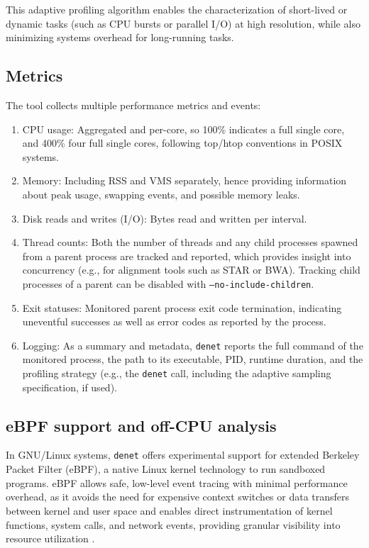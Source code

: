 \documentclass[10pt]{article}
\begin{document}
This adaptive profiling algorithm enables the characterization of short-lived or dynamic tasks (such as CPU bursts or parallel I/O) at high resolution, while also minimizing systems overhead for long-running tasks.

\subsection*{Metrics}

The tool collects multiple performance metrics and events:

\begin{enumerate}[itemsep=0.5pt, topsep=1pt]
    \item CPU usage: Aggregated and per-core, so 100\% indicates a full single core, and 400\% four full single cores, following top/htop conventions in POSIX systems.
    \item Memory: Including RSS and VMS separately, hence providing information about peak usage, swapping events, and possible memory leaks.
    \item Disk reads and writes (I/O): Bytes read and written per interval.
    \item Thread counts: Both the number of threads and any child processes spawned from a parent process are tracked and reported, which provides insight into concurrency (e.g., for alignment tools such as STAR or BWA). Tracking child processes of a parent can be disabled with \texttt{--no-include-children}.
    \item Exit statuses: Monitored parent process exit code termination, indicating uneventful successes as well as error codes as reported by the process.
    \item Logging: As a summary and metadata, \texttt{denet} reports the full command of the monitored process, the path to its executable, PID, runtime duration, and the profiling strategy (e.g., the \texttt{denet} call, including the adaptive sampling specification, if used).
\end{enumerate}

\subsection*{eBPF support and off-CPU analysis}

In GNU/Linux systems, \texttt{denet} offers experimental support for extended Berkeley Packet Filter (eBPF), a native Linux kernel technology to run sandboxed programs. eBPF allows safe, low-level event tracing with minimal performance overhead, as it avoids the need for expensive context switches or data transfers between kernel and user space and enables direct instrumentation of kernel functions, system calls, and network events, providing granular visibility into resource utilization \cite{gregg2019bpf,gbadamosi2024ebpf}. 
\end{document}

